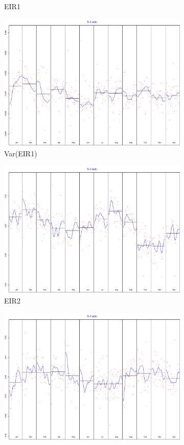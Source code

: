\documentclass[12pt,a4paper,oneside]{book}
\begin{document}
\begin{figure}[H]
\begin{subfigure}{.5\textwidth}
  \caption{EIR1}
\end{subfigure}
\begin{subfigure}{.5\textwidth}
  \centering
  \includegraphics[width=.8\linewidth]{Graphs/S-I_4.pdf}
  \caption{Var(EIR1)}
\end{subfigure}
\begin{subfigure}{.5\textwidth}
  \centering
  \includegraphics[width=.8\linewidth]{Graphs/S-I_5.pdf}
  \caption{EIR2}
\end{subfigure}
\begin{subfigure}{.5\textwidth}
  \centering
  \includegraphics[width=.8\linewidth]{Graphs/S-I_6.pdf}

\end{subfigure}
\end{figure}
\end{document}
